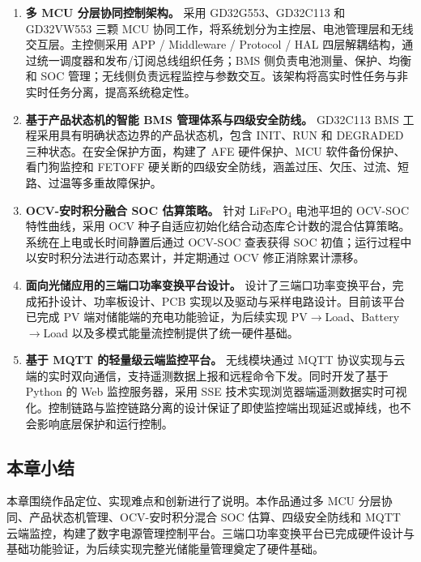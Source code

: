 \begin{enumerate}[label=\arabic*、, leftmargin=*, itemsep=0.8ex, parsep=0pt, topsep=0.5ex]
  \item \textbf{多 MCU 分层协同控制架构。}
  采用 GD32G553、GD32C113 和 GD32VW553 三颗 MCU 协同工作，将系统划分为主控层、电池管理层和无线交互层。主控侧采用 APP / Middleware / Protocol / HAL 四层解耦结构，通过统一调度器和发布/订阅总线组织任务；BMS 侧负责电池测量、保护、均衡和 SOC 管理；无线侧负责远程监控与参数交互。该架构将高实时性任务与非实时任务分离，提高系统稳定性。

  \item \textbf{基于产品状态机的智能 BMS 管理体系与四级安全防线。}
  GD32C113 BMS 工程采用具有明确状态边界的产品状态机，包含 INIT、RUN 和 DEGRADED 三种状态。在安全保护方面，构建了 AFE 硬件保护、MCU 软件备份保护、看门狗监控和 FETOFF 硬关断的四级安全防线，涵盖过压、欠压、过流、短路、过温等多重故障保护。

  \item \textbf{OCV-安时积分融合 SOC 估算策略。}
  针对 LiFePO$_4$ 电池平坦的 OCV-SOC 特性曲线，采用 OCV 种子自适应初始化结合动态库仑计数的混合估算策略。系统在上电或长时间静置后通过 OCV-SOC 查表获得 SOC 初值；运行过程中以安时积分法进行动态累计，并定期通过 OCV 修正消除累计漂移。

  \item \textbf{面向光储应用的三端口功率变换平台设计。}
  设计了三端口功率变换平台，完成拓扑设计、功率板设计、PCB 实现以及驱动与采样电路设计。目前该平台已完成 PV 端对储能端的充电功能验证，为后续实现 PV$\rightarrow$Load、Battery$\rightarrow$Load 以及多模式能量流控制提供了统一硬件基础。

  \item \textbf{基于 MQTT 的轻量级云端监控平台。}
  无线模块通过 MQTT 协议实现与云端的实时双向通信，支持遥测数据上报和远程命令下发。同时开发了基于 Python 的 Web 监控服务器，采用 SSE 技术实现浏览器端遥测数据实时可视化。控制链路与监控链路分离的设计保证了即使监控端出现延迟或掉线，也不会影响底层保护和运行控制。
\end{enumerate}

\subsection{本章小结}

本章围绕作品定位、实现难点和创新进行了说明。本作品通过多 MCU 分层协同、产品状态机管理、OCV-安时积分混合 SOC 估算、四级安全防线和 MQTT 云端监控，构建了数字电源管理控制平台。三端口功率变换平台已完成硬件设计与基础功能验证，为后续实现完整光储能量管理奠定了硬件基础。
